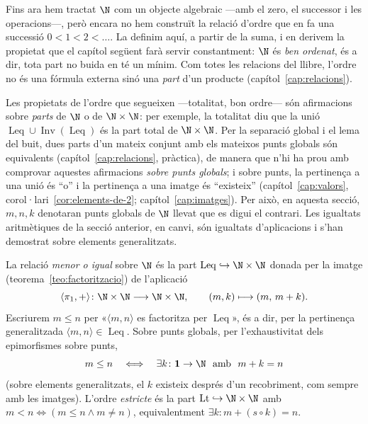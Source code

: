 Fins ara hem tractat \(\N\) com un objecte algebraic ---amb el zero, el
successor i les operacions---, però encara no hem construït la relació
d'ordre que en fa una successió \(0<1<2<\dots\). La definim aquí, a partir
de la suma, i en derivem la propietat que el capítol següent farà servir
constantment: \(\N\) és \emph{ben ordenat}, és a dir, tota part no buida en
té un mínim. Com totes les relacions del llibre, l'ordre no és una fórmula
externa sinó una \emph{part} d'un producte
(capítol~\ref{cap:relacions}).

\begin{observacio}\label{obs:ordre-sobre-punts}
Les propietats de l'ordre que segueixen ---totalitat, bon ordre--- són
afirmacions sobre \emph{parts} de \(\N\) o de \(\N\times\N\): per exemple,
la totalitat diu que la unió \(\operatorname{Leq}\cup\operatorname{Inv}(\operatorname{Leq})\)
és la part total de \(\N\times\N\). Per la separació global i el lema del
buit, dues parts d'un mateix conjunt amb els mateixos punts globals són
equivalents (capítol~\ref{cap:relacions}, pràctica), de manera que n'hi ha
prou amb comprovar aquestes afirmacions \emph{sobre punts globals}; i
sobre punts, la pertinença a una unió és \enquote{o} i la pertinença a
una imatge és \enquote{existeix} (capítol~\ref{cap:valors},
corol·lari~\ref{cor:elements-de-2}; capítol~\ref{cap:imatges}). Per això,
en aquesta secció, \(m,n,k\) denotaran punts globals de \(\N\) llevat que
es digui el contrari. Les igualtats aritmètiques de la secció anterior,
en canvi, són igualtats d'aplicacions i s'han demostrat sobre elements
generalitzats.
\end{observacio}

\begin{definicio}\label{def:ordre-naturals}
La relació \emph{menor o igual} sobre \(\N\) és la part
\(\operatorname{Leq}\hookrightarrow\N\times\N\) donada per la imatge
(teorema~\ref{teo:factoritzacio}) de l'aplicació
\[
\langle\pi_1,+\rangle\colon\N\times\N\longrightarrow\N\times\N,
\qquad
(m,k)\longmapsto(m,\,m+k).
\]
Escriurem \(m\le n\) per «\(\langle m,n\rangle\) es factoritza per
\(\operatorname{Leq}\)», és a dir, per la pertinença generalitzada
\(\langle m,n\rangle\in\operatorname{Leq}\). Sobre punts globals, per
l'exhaustivitat dels epimorfismes sobre punts,
\[
m\le n
\quad\Longleftrightarrow\quad
\exists k\colon\mathbf1\to\N\ \text{ amb }\ m+k=n
\]
(sobre elements generalitzats, el \(k\) existeix després d'un
recobriment, com sempre amb les imatges).
L'ordre \emph{estricte} és la part
\(\operatorname{Lt}\hookrightarrow\N\times\N\) amb
\(m<n\Leftrightarrow(m\le n\wedge m\ne n)\), equivalentment
\(\exists k\colon m+(s\circ k)=n\).
\end{definicio}

